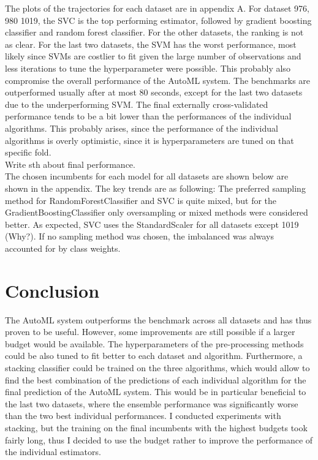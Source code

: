 \documentclass[11pt]{article}
\begin{document}
The plots of the trajectories for each dataset are in appendix A. For dataset 976, 980 1019, the SVC is the top performing estimator, followed by gradient boosting classifier and random forest classifier. For the other datasets, the ranking is not as clear. For the last two datasets, the SVM has the worst performance, most likely since SVMs are costlier to fit given the large number of observations and less iterations to tune the hyperparameter were possible. This probably also compromise the overall performance of the AutoML system. The benchmarks are outperformed usually after at most 80 seconds, except for the last two datasets due to the underperforming SVM. The final externally cross-validated performance tends to be a bit lower than the performances of the individual algorithms. This probably arises, since the performance of the individual algorithms is overly optimistic, since it is hyperparameters are tuned on that specific fold. \\

Write sth about final performance. \\

The chosen incumbents for each model for all datasets are shown below are shown in the appendix. The key trends are as following: The preferred sampling method for RandomForestClassifier and SVC is quite mixed, but for the GradientBoostingClassifier only oversampling or mixed methods were considered better. As expected, SVC uses the StandardScaler for all datasets except 1019 (Why?). If no sampling method was chosen, the imbalanced was always accounted for by class weights. \\

\section{Conclusion}

The AutoML system outperforms the benchmark across all datasets and has thus proven to be useful. However, some improvements are still possible if a larger budget would be available. The hyperparameters of the pre-processing methods could be also tuned to fit better to each dataset and algorithm. Furthermore, a stacking classifier could be trained on the three algorithms, which would allow to find the best combination of the predictions of each individual algorithm for the final prediction of the AutoML system. This would be in particular beneficial to the last two datasets, where the ensemble performance was significantly worse than the two best individual performances. I conducted experiments with stacking, but the training on the final incumbents with the highest budgets took fairly long, thus I decided to use the budget rather to improve the performance of the individual estimators.
\end{document}
